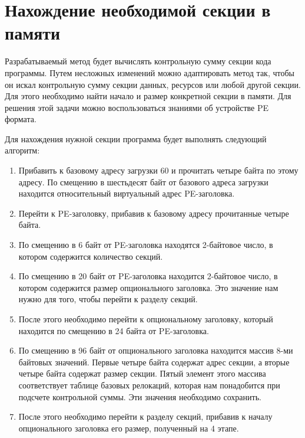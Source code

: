 
\section{Нахождение необходимой секции в памяти}

Разрабатываемый метод будет вычислять контрольную сумму секции кода программы.
Путем несложных изменений можно адаптировать метод так, чтобы он искал
контрольную сумму секции данных, ресурсов или любой другой секции. Для этого
необходимо найти начало и размер конкретной секции в памяти. Для решения этой
задачи можно воспользоваться знаниями об устройстве PE формата. 

Для нахождения нужной секции программа будет выполнять следующий алгоритм:
\begin{enumerate}
  \item Прибавить к базовому адресу загрузки 60 и прочитать четыре байта по этому
    адресу. По смещению в шестьдесят байт от базового адреса загрузки находится
    относительный виртуальный адрес PE-заголовка.
    
  \item Перейти к PE-заголовку, прибавив к базовому адресу прочитанные четыре
    байта. 

  \item По смещению в 6 байт от PE-заголовка находятся 2-байтовое число, в
    котором содержится количество секций.

  \item По смещению в 20 байт от PE-заголовка находится 2-байтовое число, в
    котором содержится размер опционального заголовка. Это значение нам нужно
    для того, чтобы перейти к разделу секций.

  \item После этого необходимо перейти к опциональному заголовку, который
    находится по смещению в 24 байта от PE-заголовка. 

  \item По смещению в 96 байт от опционального заголовка находится массив 8-ми
    байтовых значений. Первые четыре байта содержат адрес секции, а вторые
    четыре байта содержат размер секции. Пятый элемент этого массива
    соответствует таблице базовых релокаций, которая нам понадобится при
    подсчете контрольной суммы. Эти значения необходимо сохранить.

  \item После этого необходимо перейти к разделу секций, прибавив к началу
    опционального заголовка его размер, полученный на 4 этапе.


\end{enumerate}
